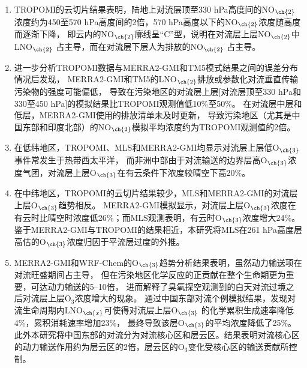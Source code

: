 \begin{enumerate}[label=（\arabic*）, labelindent=\parindent, nosep, leftmargin=0pt, widest=0, itemindent=*, topsep=0pt, partopsep=0pt, parsep=0pt]

\item TROPOMI的云切片结果表明，陆地上对流层顶至330 hPa高度间的NO$_{\ch{2}}$浓度约为450至570 hPa高度间的2倍，570 hPa高度以下的NO$_{\ch{2}}$浓度随高度而逐渐下降，
即云内的NO$_{\ch{2}}$廓线呈“C”型，说明在对流层上层NO$_{\ch{2}}$中LNO$_{\ch{2}}$ 占主导，而在对流层下层人为排放的NO$_{\ch{2}}$ 占主导。

\item 进一步分析TROPOMI数据与MERRA2-GMI和TM5模式结果之间的误差分布情况后发现，
MERRA2-GMI和TM5的LNO$_{\ch{2}}$排放或参数化对流垂直传输污染物的强度可能偏低，
导致在污染地区的对流层上层[对流层顶至330 hPa和330至450 hPa]的模拟结果比TROPOMI观测值低10\%至50\%。
在对流层中层和低层，MERRA2-GMI使用的排放清单未及时更新，
导致污染地区（尤其是中国东部和印度北部）的NO$_{\ch{2}}$模拟平均浓度约为TROPOMI观测值的2倍。

\item 在低纬地区，TROPOMI、MLS和MERRA2-GMI均显示对流层上层低O$_{\ch{3}}$事件常发生于热带西太平洋，
而非洲中部由于对流输送的边界层高O$_{\ch{3}}$浓度气团，对流层上层O$_{\ch{3}}$在有云条件下浓度较晴空下高20\%。

\item 在中纬地区，TROPOMI的云切片结果较少，MLS和MERRA2-GMI的对流层上层O$_{\ch{3}}$趋势相反。
MERRA2-GMI模拟显示，对流层上层O$_{\ch{3}}$浓度在有云时比晴空时浓度低26\%；而MLS观测表明，有云时O$_{\ch{3}}$浓度增大24\%。
鉴于MERRA2-GMI与TROPOMI的结果相近，本研究将MLS在261 hPa高度层高估的O$_{\ch{3}}$浓度归因于平流层过度的外推。

\item MERRA2-GMI和WRF-Chem的O$_{\ch{3}}$趋势分析结果表明，虽然动力输送项在对流旺盛期间占主导，
但在污染地区化学反应的正贡献在整个生命期更为重要，可达动力输送的5--10倍，
进而解释了臭氧探空观测到的白天对流过境之后对流层上层O$_3$浓度增大的现象。
通过中国东部对流个例模拟结果，发现对流生命周期内LNO$_{\ch{x}}$可使得对流层上层O$_{\ch{3}}$
的化学累积生成速率降低4\%，累积消耗速率增加23\%，
最终导致该层O$_{\ch{3}}$的平均浓度降低了25\%。
此外本研究将中国东部的对流分为对流核心区和层云区。结果表明对流核心区的动力输送作用约为层云区的2倍，层云区的O$_3$变化受核心区的输送贡献所控制。

\end{enumerate}
